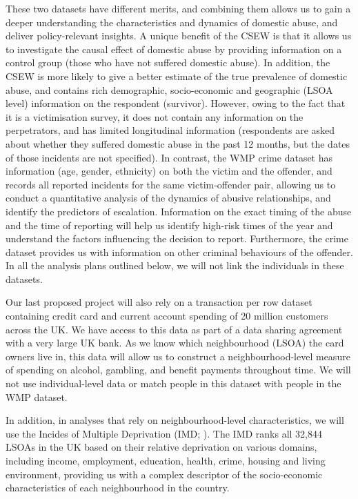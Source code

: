 \documentclass[11pt, a4paper]{article}
\begin{document}
These two datasets have different merits, and combining them allows us to gain a deeper understanding the characteristics and dynamics of domestic abuse, and deliver policy-relevant insights. A unique benefit of the CSEW is that it allows us to investigate the causal effect of domestic abuse by providing information on a control group (those who have not suffered domestic abuse). In addition, the CSEW is more likely to give a better estimate of the true prevalence of domestic abuse, and contains rich demographic, socio-economic and geographic (LSOA level) information on the respondent (survivor). However, owing to the fact that it is a victimisation survey, it does not contain any information on the perpetrators, and has limited longitudinal information (respondents are asked about whether they suffered domestic abuse in the past 12 months, but the dates of those incidents are not specified). In contrast, the WMP crime dataset has information (age, gender, ethnicity) on both the victim and the offender, and records all reported incidents for the same victim-offender pair, allowing us to conduct a quantitative analysis of the dynamics of abusive relationships, and identify the predictors of escalation. Information on the exact timing of the abuse and the time of reporting will help us identify high-risk times of the year and understand the factors influencing the decision to report. Furthermore, the crime dataset provides us with information on other criminal behaviours of the offender. In all the analysis plans outlined below, we will not link the individuals in these datasets.


Our last proposed project will also rely on a transaction per row dataset containing credit card and current account spending of 20 million customers across the UK. We have access to this data as part of a data sharing agreement with a very large UK bank. As we know which neighbourhood (LSOA) the card owners live in, this data will allow us to construct a neighbourhood-level measure of spending on alcohol, gambling, and benefit payments throughout time. We will not use individual-level data or match people in this dataset with people in the WMP dataset. 


In addition, in analyses that rely on neighbourhood-level characteristics, we will use the Incides of Multiple Deprivation (IMD; ). The IMD ranks all 32,844 LSOAs in the UK based on their relative deprivation on various domains, including income, employment, education, health, crime, housing and living environment, providing us with a complex descriptor of the socio-economic characteristics of each neighbourhood in the country.  
\end{document}
